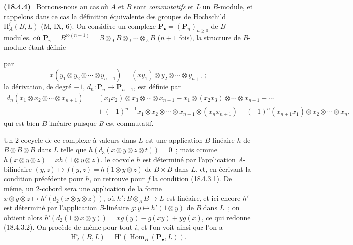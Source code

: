\documentclass[10pt,oneside]{book}
\makeatletter
\newcommand{\setmanualcurrentlabel}[1]{\def\@currentlabel{#1}}
\newcommand{\oldpage}[2][]{%
  \setcounter{footnote}{0}%
  \marginpar{\scriptsize\textbf{#1}~|~#2}\ignorespaces}
\newenvironment{env}[1][]{\setmanualcurrentlabel{#1}\par\medskip\noindent\textbf{(#1)}\ }{\par}
\makeatother
\begin{document}
\begin{env}[18.4.4]
\label{0.18.4.4-fr}
Bornons-nous au cas où $A$ et $B$ sont \emph{commutatifs} et $L$ un
$B$-module, et rappelons dans ce cas la définition équivalente des groupes de
Hochschild $\mathrm H_A^i(B,L)$ (M, IX, 6). On considère un complexe
$\mathbf P_\bullet=(\mathbf P_n)_{n\geqslant0}$ de $B$-modules, où
$\mathbf P_n=B^{\otimes(n+1)}=B\otimes_A B\otimes_A\cdots\otimes_A B$
($n+1$ fois), la structure de $B$-module étant définie

\oldpage[0\textsubscript{IV-1}]{66}

par
\[
  x(y_1\otimes y_2\otimes\cdots\otimes y_{n+1})
  =(xy_1)\otimes y_2\otimes\cdots\otimes y_{n+1}\,;
\]
la dérivation, de degré $-1$, $d_n:\mathbf P_n\to\mathbf P_{n-1}$, est
définie par
\begin{align*}
  d_n(x_1\otimes x_2\otimes\cdots\otimes x_{n+1})
    &=(x_1x_2)\otimes x_3\otimes\cdots\otimes x_{n+1}
      -x_1\otimes(x_2x_3)\otimes\cdots\otimes x_{n+1}+\cdots\\
    &\quad+(-1)^{n-1}x_1\otimes x_2\otimes\cdots\otimes x_{n-1}
      \otimes(x_nx_{n+1})
      +(-1)^n(x_{n+1}x_1)\otimes x_2\otimes\cdots\otimes x_n,
\end{align*}
qui est bien $B$-linéaire puisque $B$ est commutatif.

Un $2$-cocycle de ce complexe à valeurs dans $L$ est une application
$B$-linéaire $h$ de $B\otimes B\otimes B$ dans $L$ telle que
$h(d_3(x\otimes y\otimes z\otimes t))=0$~; mais comme
$h(x\otimes y\otimes z)=xh(1\otimes y\otimes z)$, le cocycle $h$ est déterminé
par l'application $A$-bilinéaire
$(y,z)\longmapsto f(y,z)=h(1\otimes y\otimes z)$ de $B\times B$ dans $L$, et,
en écrivant la condition précédente pour $h$, on retrouve pour $f$ la
condition (18.4.3.1). De même, un $2$-cobord sera une application de la forme
$x\otimes y\otimes z\longmapsto h'(d_2(x\otimes y\otimes z))$, où
$h':B\otimes_A B\to L$ est linéaire, et ici encore $h'$ est déterminé par
l'application $B$-linéaire $g:y\longmapsto h'(1\otimes y)$ de $B$ dans $L$~;
on obtient alors
$h'(d_2(1\otimes x\otimes y))=xg(y)-g(xy)+yg(x)$, ce qui redonne (18.4.3.2).
On procède de même pour tout $i$, et l'on voit ainsi que l'on a
\begin{equation}
\label{0.18.4.4.1-fr}
\tag{18.4.4.1}
  \mathrm H_A^i(B,L)=\mathrm H^i(\operatorname{Hom}_B(\mathbf P_\bullet,L)).
\end{equation}
\end{env}
\end{document}
